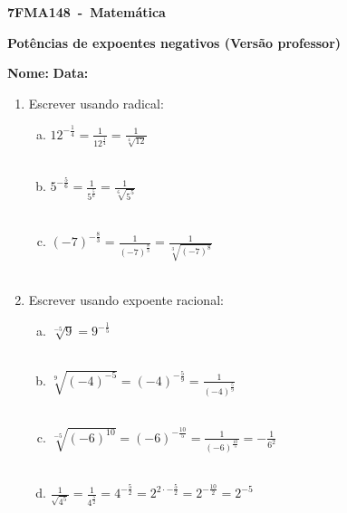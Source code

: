\documentclass[a4paper,14pt]{article}
\begin{document}
	
	\noindent\textbf{7FMA148~-~Matemática} 
	
	\begin{center}
		\textbf{Potências de expoentes negativos (Versão professor)}
	\end{center}
	
	
	\noindent\textbf{Nome:} \underline{\hspace{10cm}}
    \noindent\textbf{Data:} \underline{\hspace{4cm}}
	
	
	\begin{multicols}{2}
	\begin{enumerate}	
		\item Escrever usando radical:
		\begin{enumerate}[a)]
			\item $12^{-\frac{1}{4}} = \frac{1}{12^\frac{1}{4}} = \frac{1}{\sqrt[4]{12}}$ \\\\
			\item $5^{-\frac{5}{6}} = \frac{1}{5^{\frac{5}{6}}} = \frac{1}{\sqrt[6]{5^5}}$ \\\\
			\item $(-7)^{-\frac{8}{3}} = \frac{1}{(-7)^{\frac{8}{3}}} = \frac{1}{\sqrt[3]{(-7)^8}}$ \\\\
	    \end{enumerate}
        \item Escrever usando expoente racional:
        \begin{enumerate}[a)]
        	\item $\sqrt[-5]{9} = 9^{-\frac{1}{5}}$ \\\\
        	\item $\sqrt[9]{(-4)^{-5}} = (-4)^{-\frac{5}{9}} = \frac{1}{(-4)^\frac{5}{9}}$ \\\\
        	\item $\sqrt[-5]{(-6)^{10}} = (-6)^{-\frac{10}{5}} = \frac{1}{(-6)^\frac{10}{5}} = - \frac{1}{6^2}$ \\\\
        	\item $\frac{1}{\sqrt{4^5}} = \frac{1}{4^\frac{5}{2}} = 4^{-\frac{5}{2}} = 2^{2 \cdot -\frac{5}{2}} = 2^{-\frac{10}{2}} = 2^{-5}$ \\

\end{enumerate}
\end{enumerate}
\end{multicols}
\end{document}
